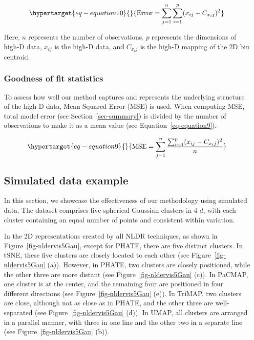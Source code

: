 \documentclass[
  12pt]{article}
\begin{document}
\begin{equation}\protect\hypertarget{eq-equation10}{}{
\text{Error} = \sum_{j = 1}^{n}\sum_{i = 1}^{p} (x_{ij} - C_{x_ij})^2
}\label{eq-equation10}\end{equation}

Here, \(n\) represents the number of observations, \(p\) represents the
dimensions of high-D data, \(x_{ij}\) is the high-D data, and
\(C_{x_ij}\) is the high-D mapping of the 2D bin centroid.

\hypertarget{sec-goodfit}{%
\subsubsection{Goodness of fit statistics}\label{sec-goodfit}}

To assess how well our method captures and represents the underlying
structure of the high-D data, Mean Squared Error (MSE) is used. When
computing MSE, total model error (see Section~\ref{sec-summary}) is
divided by the number of observations to make it as a mean value (see
Equation~\ref{eq-equation9}).

\begin{equation}\protect\hypertarget{eq-equation9}{}{
\text{MSE} = \sum_{j = 1}^{n} \frac{\sum_{i = 1}^{p} (x_{ij} - C_{x_ij})^2}{n}
}\label{eq-equation9}\end{equation}

\hypertarget{sec-simpleex}{%
\subsection{Simulated data example}\label{sec-simpleex}}

In this section, we showcase the effectiveness of our methodology using
simulated data. The dataset comprises five spherical Gaussian clusters
in 4-\(d\), with each cluster containing an equal number of points and
consistent within variation.

In the 2D representations created by all NLDR techniques, as shown in
Figure~\ref{fig-nldervis5Gau}, except for PHATE, there are five distinct
clusters. In tSNE, these five clusters are closely located to each other
(see Figure~\ref{fig-nldervis5Gau} (a)). However, in PHATE, two clusters
are closely positioned, while the other three are more distant (see
Figure~\ref{fig-nldervis5Gau} (c)). In PaCMAP, one cluster is at the
center, and the remaining four are positioned in four different
directions (see Figure~\ref{fig-nldervis5Gau} (e)). In TriMAP, two
clusters are close, although not as close as in PHATE, and the other
three are well-separated (see Figure~\ref{fig-nldervis5Gau} (d)). In
UMAP, all clusters are arranged in a parallel manner, with three in one
line and the other two in a separate line (see
Figure~\ref{fig-nldervis5Gau} (b)).
\end{document}

